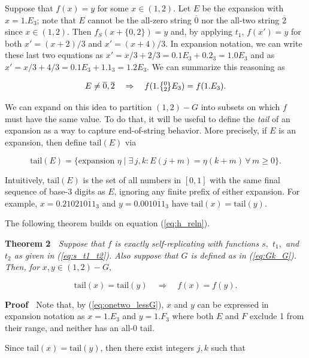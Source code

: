 \documentclass[20pt,]{extarticle}
\newcommand{\optquad}{\quad}
\begin{document}
Suppose that \(f(x) = y\) for some \(x\in (1,2)\). Let \(E\) be the
expansion with \(x=1.E_3\); note that \(E\) cannot be the all-zero
string \(\overline 0\) nor the all-two string \(\overline 2\) since
\(x\in (1,2)\). Then \(f_S(x+\{0,2\}) = y\) and, by applying \(t_1\),
\(f(x') = y\) for both \(x' = (x+2)/3\) and \(x' = (x+4)/3\). In
expansion notation, we can write these last two equations as
\(x' = x/3 + 2/3 = 0.1E_3 + 0.2_3 = 1.0E_3\) and as
\(x' = x/3 + 4/3 = 0.1E_3 + 1.1_3 = 1.2E_3\). We can summarize this
reasoning as

\begin{equation}E\ne \overline 0, \overline 2 \optquad\Rightarrow\optquad
f(1.\zerotwo E_3) = f(1.E_3).\label{eq:h_reln}\end{equation}

\newcommand{\tail}{\text{tail}}

We can expand on this idea to partition \((1,2) - G\) into subsets on
which \(f\) must have the same value. To do that, it will be useful to
define the \emph{tail} of an expansion as a way to capture end-of-string
behavior. More precisely, if \(E\) is an expansion, then define
\(\tail(E)\) via

\[\tail(E) = \big\{\text{expansion }\eta \;\big|\;
\exists\, j, k: E(j + m) = \eta(k + m) \,\forall\, m \ge 0\big\}.\]

Intuitively, \(\tail(E)\) is the set of all numbers in \([0, 1]\) with
the same final sequence of base-3 digits as \(E\), ignoring any finite
prefix of either expansion. For example, \(x=0.21021\overline{011}_3\)
and \(y=0.001\overline{011}_3\) have
\(\text{tail}(x) = \text{tail}(y)\).

The following theorem builds on equation (\ref{eq:h_reln}).

\textbf{Theorem 2} \(\;\) \emph{Suppose that \(f\) is exactly
self-replicating with functions \(s,\) \(t_1,\) and \(t_2\) as given in
(\ref{eq:s_t1_t2}). Also suppose that \(G\) is defined as in
(\ref{eq:Gk_G}). Then, for} \(x,y\in (1,2)-G,\)

\[\tail(x) = \tail(y) \quad\Rightarrow\quad f(x) = f(y).\]

\textbf{Proof} \(\;\) Note that, by (\ref{eq:onetwo_lessG}), \(x\) and
\(y\) can be expressed in expansion notation as \(x=1.E_3\) and
\(y=1.F_3\) where both \(E\) and \(F\) exclude 1 from their range, and
neither has an all-0 tail.

Since \(\tail(x) = \tail(y)\), then there exist integers \(j, k\) such
that
\end{document}
